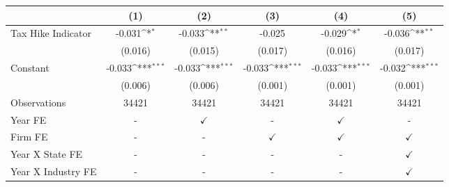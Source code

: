 {
\def\sym#1{\ifmmode^{#1}\else\(^{#1}\)\fi}
\begin{tabular}{l*{5}{c}}
\toprule
                    &\multicolumn{1}{c}{(1)}         &\multicolumn{1}{c}{(2)}         &\multicolumn{1}{c}{(3)}         &\multicolumn{1}{c}{(4)}         &\multicolumn{1}{c}{(5)}         \\
\midrule
Tax Hike Indicator  &      -0.031\sym{*}  &      -0.033\sym{**} &      -0.025         &      -0.029\sym{*}  &      -0.036\sym{**} \\
                    &     (0.016)         &     (0.015)         &     (0.017)         &     (0.016)         &     (0.017)         \\
Constant            &      -0.033\sym{***}&      -0.033\sym{***}&      -0.033\sym{***}&      -0.033\sym{***}&      -0.032\sym{***}\\
                    &     (0.006)         &     (0.006)         &     (0.001)         &     (0.001)         &     (0.001)         \\
\midrule
Observations        &       34421         &       34421         &       34421         &       34421         &       34421         \\
Year FE             &           -         &$\checkmark$         &           -         &$\checkmark$         &           -         \\
Firm FE             &           -         &           -         &$\checkmark$         &$\checkmark$         &$\checkmark$         \\
Year X State FE     &           -         &           -         &           -         &           -         &$\checkmark$         \\
Year X Industry FE  &           -         &           -         &           -         &           -         &$\checkmark$         \\
\bottomrule
\end{tabular}
}
